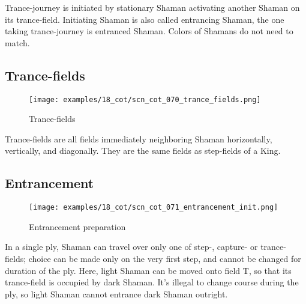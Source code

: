 \vspace*{-0.7\baselineskip}
Trance-journey is initiated by stationary Shaman activating another Shaman
on its trance-field. Initiating Shaman is also called entrancing Shaman, the
one taking trance-journey is entranced Shaman.
Colors of Shamans do not need to match.

\vspace*{-0.7\baselineskip}
\subsection*{Trance-fields}
\label{sec:Conquest of Tlalocan/Trance-journey/Trance-fields}

\vspace*{-0.9\baselineskip}
\noindent
\begin{wrapfigure}[5]{l}{0.4\textwidth}
\centering
\texttt{[image: examples/18\_cot/scn\_cot\_070\_trance\_fields.png]}
\vspace*{-0.4\baselineskip}
\caption{Trance-fields}
\label{fig:scn_cot_070_trance_fields}
\end{wrapfigure}
Trance-fields are all fields immediately neighboring Shaman horizontally,
vertically, and diagonally. They are the same fields as step-fields of a King.

\vspace*{2.3\baselineskip}

\subsection*{Entrancement}
\label{sec:Conquest of Tlalocan/Trance-journey/Entrancement}

\vspace*{-0.9\baselineskip}
\noindent
\begin{wrapfigure}[13]{l}{0.4\textwidth}
\centering
\texttt{[image: examples/18\_cot/scn\_cot\_071\_entrancement\_init.png]}
\vspace*{-0.4\baselineskip}
\caption{Entrancement preparation}
\label{fig:scn_cot_071_entrancement_init}
\end{wrapfigure}
In a single ply, Shaman can travel over only one of step-, capture- or trance-fields;
choice can be made only on the very first step, and cannot be changed for duration of
the ply.\newline
\indent
Here, light Shaman can be moved onto field T, so that its trance-field is occupied by
dark Shaman. It's illegal to change course during the ply, so light Shaman cannot
entrance dark Shaman outright.

